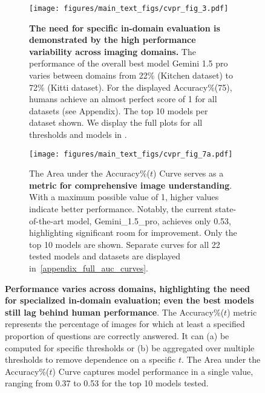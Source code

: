 \begin{figure*}[ht]
    \centering
    
    \begin{subfigure}{0.95\linewidth}
        \centering
        \texttt{[image: figures/main\_text\_figs/cvpr\_fig\_3.pdf]}
        \caption{\textbf{The need for specific in-domain evaluation is demonstrated by the high performance variability across imaging domains.} 
        The performance of the overall best model Gemini 1.5 pro varies between domains from 22\% (Kitchen dataset) to 72\% (Kitti dataset). 
        For the displayed Accuracy\%(75), humans achieve an almost perfect score of 1 for all datasets (see Appendix). The top 10 models per dataset shown. 
        We display the full plots for all thresholds and models in .}
        \label{fig:acc_sub1}
    \end{subfigure}
    
    
    \begin{subfigure}{0.95\linewidth}
        \centering
        \texttt{[image: figures/main\_text\_figs/cvpr\_fig\_7a.pdf]}
        \caption{The Area under the Accuracy\%($t$) Curve serves as a \textbf{metric for comprehensive image understanding}. 
        With a maximum possible value of 1, higher values indicate better performance. 
        Notably, the current state-of-the-art model, Gemini\_1.5\_pro, achieves only 0.53, highlighting significant room for improvement. 
        Only the top 10 models are shown. 
        Separate curves for all 22 tested models and datasets are displayed in~\cref{appendix_full_auc_curves}.}
        \label{fig:full_ACC_perc_curves}
    \end{subfigure}
    
    \caption{\textbf{Performance varies across domains, highlighting the need for specialized in-domain evaluation; even the best models still lag behind human performance}. 
    The Accuracy\%($t$) metric represents the percentage of images for which at least a specified proportion of questions are correctly answered. 
    It can (a) be computed for specific thresholds or (b) be aggregated over multiple thresholds to remove dependence on a specific $t$. 
    The Area under the Accuracy\%($t$) Curve captures model performance in a single value, ranging from 0.37 to 0.53 for the top 10 models tested.}
    \label{fig:acc_per_global_fig}
\end{figure*}
